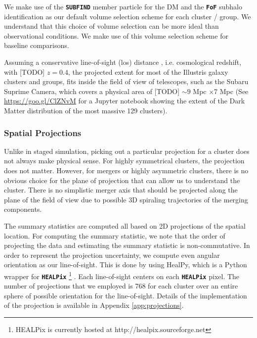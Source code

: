 We make use of the {\bf \texttt{SUBFIND}} member particle for the DM and the 
{\bf \texttt{FoF}} subhalo identification as our
default volume selection scheme for each cluster / group.
We understand that this choice of volume selection can be more ideal than
observational conditions. We make use of this volume selection scheme
for baseline comparisons. 

Assuming a conservative line-of-sight (los) distance 
, i.e. cosmological redshift, with [TODO] $z = 0.4$, 
the projected extent for most of the Illustris galaxy clusters and groups, 
fits inside the field of view of telescopes, such as the Subaru Suprime Camera,
which covers a physical area of [TODO] $\sim 9$ Mpc $\times 7$ Mpc 
(See \href{https://goo.gl/ClZNvM}{https://goo.gl/ClZNvM} for a Jupyter notebook 
showing the extent of the Dark Matter distribution of the most massive 129
clusters).

\subsubsection{Spatial Projections}
\label{subsubsec:projections}
Unlike in staged simulation, picking out a particular projection for a cluster 
does not always make physical sense.
For highly symmetrical clusters, the projection does not matter. 
However, for mergers or highly asymmetric clusters, 
there is no obvious choice for the plane of projection that can allow us to
understand the cluster. There is no simplistic merger axis that should be 
projected along the plane of the field of view due to possible 3D spiraling
trajectories of the merging components. 

The summary statistics are computed all based on 2D projections of the
spatial location.
For computing the summary statistic, we note that 
the order of projecting the data and estimating the summary statistic is
non-commutative.  
In order to represent the projection uncertainty, we compute even angular
orientation as our line-of-sight.
This is done by using HealPy, which is a Python wrapper for
{\bf \texttt{HEALPix}} \footnote{HEALPix is
currently hosted at http://healpix.sourceforge.net}
\citep{Gorski2005}. Each line-of-sight centers on each {\bf \texttt{HEALPix}} 
pixel.
The number of projections that we employed is 768 for each cluster over an
entire sphere of possible orientation for the line-of-sight. 
Details of the implementation of the projection is available in Appendix
\ref{app:projections}.


